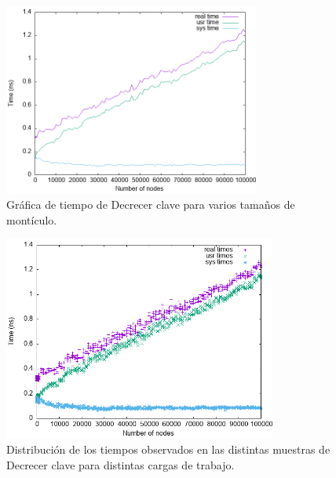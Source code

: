 \documentclass[6pt]{AiTex}
\begin{document}
\begin{figure}[H]
    \includegraphics[width = 0.75\textwidth]{./images/average-decrease-key-plot.png}
    \caption{Gráfica de tiempo de Decrecer clave para varios tamaños de montículo.}
    \label{fig:decrease-key-plot}
\end{figure}

\begin{figure}[H]
    \includegraphics[width = 0.8\textwidth]{./images/decrease-key-plot.png}
    \caption{Distribución de los tiempos observados en las distintas muestras de Decrecer clave para distintas cargas de trabajo.}
    \label{fig:prim-plot}
\end{figure}
\end{document}
